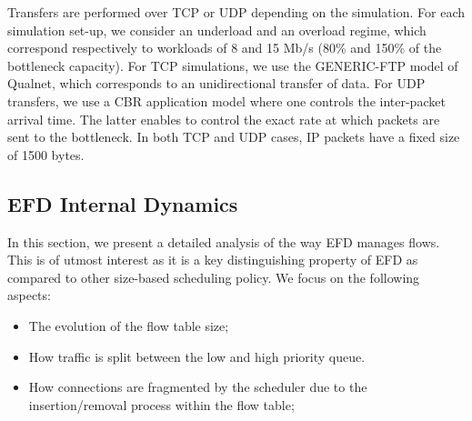 \documentclass[preprint,12pt]{elsarticle}
\begin{document}
Transfers are performed over TCP or UDP depending on the simulation. For each simulation set-up, we consider an underload and an overload regime, which correspond respectively to workloads of 8 and 15 Mb/s (80\% and 150\% of the bottleneck capacity). For TCP simulations, we use the GENERIC-FTP model of Qualnet, which corresponds to an unidirectional transfer of data. For UDP transfers, we use a CBR application model where one controls the inter-packet arrival time. The latter enables to control the exact rate at which packets are sent to the bottleneck. In both TCP and UDP cases, IP packets have a fixed size of 1500 bytes.


\subsection{EFD Internal Dynamics }


In this section, we present a detailed analysis of the way EFD manages flows. This is of utmost interest as it is a key distinguishing property of EFD as compared to other size-based scheduling policy. We focus on the following aspects:
\begin{itemize}
\item The evolution of the flow table size;
\item How traffic is split between the low and high priority queue.
\item  How connections are fragmented by the scheduler due to the insertion/removal process within the flow table;
\end{itemize}


\end{document}
